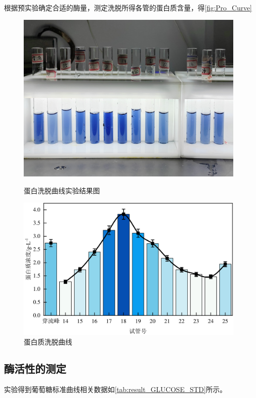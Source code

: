 根据预实验确定合适的酶量，测定洗脱所得各管的蛋白质含量，得\autoref{fig:Pro_Curve}

\begin{figure}[H]
    \begin{minipage}[t]{0.47\textwidth}
        \includegraphics[width = \textwidth]{figure/1124/Pro_Curve.jpg}
        \caption{蛋白洗脱曲线实验结果图}
        \label{fig:Pro_Curve_result}
    \end{minipage}
    \begin{minipage}[t]{0.52\textwidth}
        \includegraphics[width = \textwidth]{figure/1124/Pro_Curve.pdf}
        \caption{蛋白质洗脱曲线}
        \label{fig:Pro_Curve}
    \end{minipage}
\end{figure}

\subsection{酶活性的测定}
实验得到葡萄糖标准曲线相关数据如\autoref{tab:result_GLUCOSE_STD}所示。

